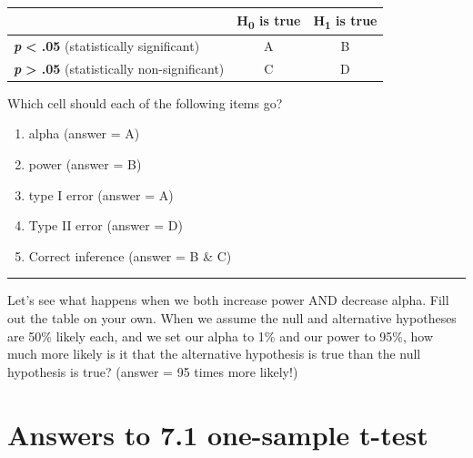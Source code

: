 \documentclass[
]{book}
\providecommand{\tightlist}{%
  \setlength{\itemsep}{0pt}\setlength{\parskip}{0pt}}
\begin{document}
\begin{longtable}[]{@{}lcc@{}}
\toprule
& H\textsubscript{0} is true & H\textsubscript{1} is true \\
\midrule
\endhead
\textbf{\emph{p}} \textbf{\textless{} .05} (statistically significant) & A & B \\
\textbf{\emph{p}} \textbf{\textgreater{} .05} (statistically non-significant) & C & D \\
\bottomrule
\end{longtable}

Which cell should each of the following items go?

\begin{enumerate}
\def\labelenumi{\arabic{enumi}.}
\tightlist
\item
  alpha (answer = A)
\item
  power (answer = B)
\item
  type I error (answer = A)
\item
  Type II error (answer = D)
\item
  Correct inference (answer = B \& C)
\end{enumerate}

\begin{center}\rule{0.5\linewidth}{0.5pt}\end{center}

Let's see what happens when we both increase power AND decrease alpha. Fill out the table on your own. When we assume the null and alternative hypotheses are 50\% likely each, and we set our alpha to 1\% and our power to 95\%, how much more likely is it that the alternative hypothesis is true than the null hypothesis is true? (answer = 95 times more likely!)

\hypertarget{answers-to-7.1-one-sample-t-test}{%
\section{Answers to 7.1 one-sample t-test}\label{answers-to-7.1-one-sample-t-test}}
\end{document}

